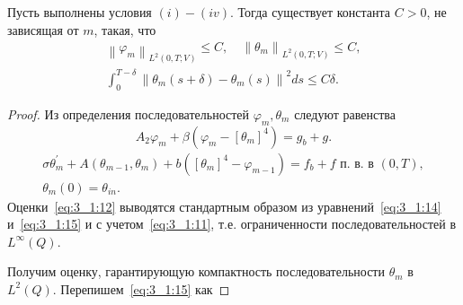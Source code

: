 \begin{lemma}
    \label{lm:3_1:3}
    Пусть выполнены условия $(i)-(iv)$.
    Тогда существует константа $C > 0$, не зависящая от $m$, такая, что
    \begin{gather}
        \left\|\varphi_{m}\right\|_{L^{2}(0, T ; V)} \leq C,
        \quad\left\|\theta_{m}\right\|_{L^{2}(0, T ; V)} \leq C, \label{eq:3_1:12}\\
        \int_{0}^{T-\delta}\left\|\theta_{m}(s+\delta)
        -\theta_{m}(s)\right\|^{2} d s \leq C \delta.\label{eq:3_1:13}
    \end{gather}
\end{lemma}

\begin{proof}
    Из определения последовательностей $\varphi_{m}, \theta_{m}$ следуют равенства
    \begin{equation}
        \label{eq:3_1:14}
        A_{2} \varphi_{m}+\beta\left(\varphi_{m}
        -\left[\theta_{m}\right]^{4}\right)=g_{b}+g.
    \end{equation}
    \begin{equation}
        \label{eq:3_1:15}
        \begin{gathered}
            \sigma \theta_{m}^{\prime}+A\left(\theta_{m-1},
            \theta_{m}\right)+b\left(\left[\theta_{m}\right]^{4}-\varphi_{m-1}\right)=f_{b}+f
            \text { п. в. в }(0, T), \\ \theta_{m}(0)=\theta_{i n}.
        \end{gathered}
    \end{equation}
    Оценки~\eqref{eq:3_1:12} выводятся стандартным образом
    из уравнений~\eqref{eq:3_1:14} и~\eqref{eq:3_1:15}
    и с учетом~\eqref{eq:3_1:11}, т.е. ограниченности
    последовательностей в $L^{\infty}(Q)$.

    Получим оценку, гарантирующую компактность последовательности
    $\theta_{m}$ в $L^{2}(Q)$.
    Перепишем~\eqref{eq:3_1:15} как


\end{proof}
